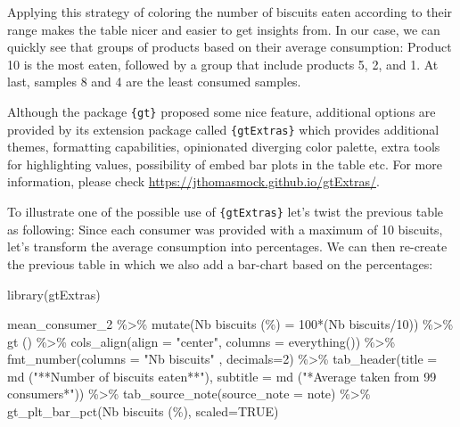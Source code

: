 \documentclass[
]{krantz}
\makeatletter
\newenvironment{Shaded}{\begin{snugshade}}{\end{snugshade}}
\newcommand{\AttributeTok}[1]{\textcolor[rgb]{0.61,0.61,0.61}{#1}}
\newcommand{\ConstantTok}[1]{\textcolor[rgb]{0,0,0}{#1}}
\newcommand{\DecValTok}[1]{\textcolor[rgb]{0.06,0.06,0.06}{#1}}
\newcommand{\FunctionTok}[1]{\textcolor[rgb]{0,0,0}{#1}}
\newcommand{\NormalTok}[1]{#1}
\newcommand{\OtherTok}[1]{\textcolor[rgb]{0.37,0.37,0.37}{#1}}
\newcommand{\SpecialCharTok}[1]{\textcolor[rgb]{0,0,0}{#1}}
\newcommand{\StringTok}[1]{\textcolor[rgb]{0.5,0.5,0.5}{#1}}
\newenvironment{kframe}{%
\medskip{}
\setlength{\fboxsep}{.8em}
 \def\at@end@of@kframe{}%
 \ifinner\ifhmode%
  \def\at@end@of@kframe{\end{minipage}}%
  \begin{minipage}{\columnwidth}%
 \fi\fi%
 \def\FrameCommand##1{\hskip\@totalleftmargin \hskip-\fboxsep
 \colorbox{shadecolor}{##1}\hskip-\fboxsep
     \hskip-\linewidth \hskip-\@totalleftmargin \hskip\columnwidth}%
 \MakeFramed {\advance\hsize-\width
   \@totalleftmargin\z@ \linewidth\hsize
   \@setminipage}}%
 {\par\unskip\endMakeFramed%
 \at@end@of@kframe}
\renewenvironment{Shaded}{\begin{kframe}}{\end{kframe}}
\makeatother
\begin{document}
Applying this strategy of coloring the number of biscuits eaten according to their range makes the table nicer and easier to get insights from. In our case, we can quickly see that groups of products based on their average consumption: Product 10 is the most eaten, followed by a group that include products 5, 2, and 1. At last, samples 8 and 4 are the least consumed samples.

Although the package \texttt{\{gt\}} proposed some nice feature, additional options are provided by its extension package called \texttt{\{gtExtras\}} which provides additional themes, formatting capabilities, opinionated diverging color palette, extra tools for highlighting values, possibility of embed bar plots in the table etc. For more information, please check \url{https://jthomasmock.github.io/gtExtras/}.

To illustrate one of the possible use of \texttt{\{gtExtras\}} let's twist the previous table as following: Since each consumer was provided with a maximum of 10 biscuits, let's transform the average consumption into percentages. We can then re-create the previous table in which we also add a bar-chart based on the percentages:

\begin{Shaded}
\begin{Highlighting}[]
\FunctionTok{library}\NormalTok{(gtExtras)}

\NormalTok{mean\_consumer\_2 }\SpecialCharTok{\%\textgreater{}\%}
  \FunctionTok{mutate}\NormalTok{(}\StringTok{\textasciigrave{}}\AttributeTok{Nb biscuits (\%)}\StringTok{\textasciigrave{}} \OtherTok{=} \DecValTok{100}\SpecialCharTok{*}\NormalTok{(}\StringTok{\textasciigrave{}}\AttributeTok{Nb biscuits}\StringTok{\textasciigrave{}}\SpecialCharTok{/}\DecValTok{10}\NormalTok{)) }\SpecialCharTok{\%\textgreater{}\%} 
  \FunctionTok{gt}\NormalTok{ () }\SpecialCharTok{\%\textgreater{}\%}
  \FunctionTok{cols\_align}\NormalTok{(}\AttributeTok{align =} \StringTok{"center"}\NormalTok{, }\AttributeTok{columns =} \FunctionTok{everything}\NormalTok{()) }\SpecialCharTok{\%\textgreater{}\%}
  \FunctionTok{fmt\_number}\NormalTok{(}\AttributeTok{columns =} \StringTok{"Nb biscuits"}\NormalTok{ , }\AttributeTok{decimals=}\DecValTok{2}\NormalTok{) }\SpecialCharTok{\%\textgreater{}\%}
  \FunctionTok{tab\_header}\NormalTok{(}\AttributeTok{title =} \FunctionTok{md}\NormalTok{ (}\StringTok{"**Number of biscuits eaten**"}\NormalTok{), }
             \AttributeTok{subtitle =} \FunctionTok{md}\NormalTok{ (}\StringTok{"*Average taken from 99 consumers*"}\NormalTok{)) }\SpecialCharTok{\%\textgreater{}\%}
  \FunctionTok{tab\_source\_note}\NormalTok{(}\AttributeTok{source\_note =}\NormalTok{ note) }\SpecialCharTok{\%\textgreater{}\%} 
  \FunctionTok{gt\_plt\_bar\_pct}\NormalTok{(}\StringTok{\textasciigrave{}}\AttributeTok{Nb biscuits (\%)}\StringTok{\textasciigrave{}}\NormalTok{, }\AttributeTok{scaled=}\ConstantTok{TRUE}\NormalTok{)}
\end{Highlighting}
\end{Shaded}
\end{document}

